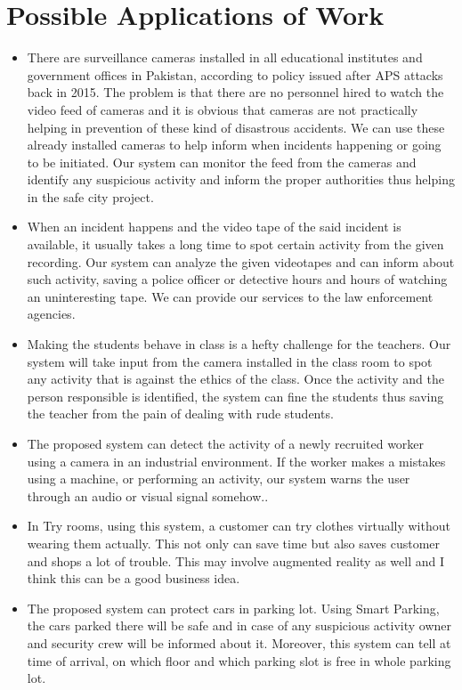 \documentclass[11pt]{article}
\begin{document}
\section{\textbf{Possible Applications of Work}}
\begin{itemize}
\item There are surveillance cameras installed in all educational institutes and government offices in Pakistan, according to policy issued after APS attacks back in 2015. The problem is that there are no personnel hired to watch the video feed of cameras and it is obvious that cameras are not practically helping in prevention of these kind of disastrous accidents. We can use these already installed cameras to help inform when incidents happening or going to be initiated. Our system can monitor the feed from the cameras and identify any suspicious activity and inform the proper authorities thus helping in the safe city project.
 
\item When an incident happens and the video tape of the said incident is available, it usually takes a long time to spot certain activity from the given recording. Our system can analyze the given videotapes and can inform about such activity, saving a police officer or detective hours and hours of watching an uninteresting tape. We can provide our 
services to the law enforcement agencies. 

\item Making the students behave in class is a hefty challenge for the teachers. Our system will take input from the camera installed in the class room to spot any activity that is against the ethics of the class. Once the activity and the person responsible is identified, the system can fine the students thus saving the teacher from the pain of dealing with rude students. 


\item The proposed system can detect the activity of a newly recruited worker using a camera in an industrial environment. If the worker makes a mistakes using a machine, or performing an activity, our system warns the user through an audio or visual signal somehow..
\item In Try rooms, using this system, a customer can try clothes virtually without wearing them actually. This not only can save time but also saves customer and shops a lot of trouble. This may involve augmented reality as well and I think this can be a good business idea. 
\item The proposed system can protect cars in parking lot. Using Smart Parking, the cars parked there will be safe and in case of any suspicious activity owner and security crew will be informed about it. Moreover, this system can tell at time of arrival, on which floor and which parking slot is free in whole parking lot.
\end{itemize}
\end{document}
